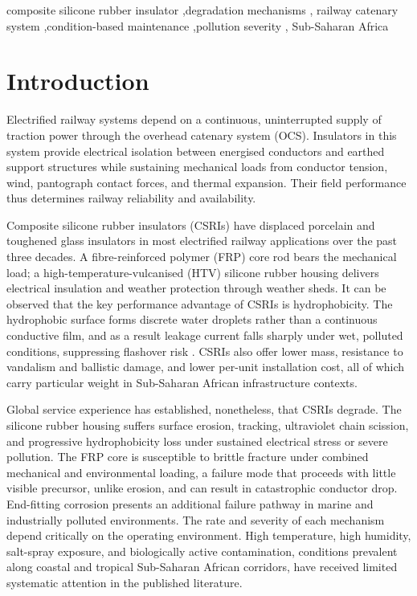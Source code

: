\documentclass[preprint,12pt,3p]{elsarticle}
\begin{document}
\begin{frontmatter}
\begin{keyword}
composite silicone rubber insulator \sep degradation mechanisms \sep
railway catenary system \sep condition-based maintenance \sep pollution severity \sep
Sub-Saharan Africa
\end{keyword}

\end{frontmatter}

\linenumbers

\section{Introduction}
\label{sec:intro}

Electrified railway systems depend on a continuous, uninterrupted supply of
traction power through the overhead catenary system (OCS). Insulators in this
system provide electrical isolation between energised conductors and earthed
support structures while sustaining mechanical loads from conductor tension,
wind, pantograph contact forces, and thermal expansion. Their field performance
thus determines railway reliability and availability.

Composite silicone rubber insulators (CSRIs) have displaced porcelain and
toughened glass insulators in most electrified railway applications over the
past three decades. A fibre-reinforced polymer (FRP) core rod bears the
mechanical load; a high-temperature-vulcanised (HTV) silicone rubber housing
delivers electrical insulation and weather protection through weather sheds.
It can be observed that the key performance advantage of CSRIs is
hydrophobicity. The hydrophobic surface forms discrete water droplets rather
than a continuous conductive film, and as a result leakage current falls
sharply under wet, polluted conditions, suppressing flashover risk
\cite{Gorur1999,Gubanski1990}. CSRIs also offer lower mass, resistance to
vandalism and ballistic damage, and lower per-unit installation cost, all of
which carry particular weight in Sub-Saharan African infrastructure contexts.

Global service experience has established, nonetheless, that CSRIs degrade.
The silicone rubber housing suffers surface erosion, tracking, ultraviolet
chain scission, and progressive hydrophobicity loss under sustained electrical
stress or severe pollution. The FRP core is susceptible to brittle fracture
under combined mechanical and environmental loading, a failure mode that
proceeds with little visible precursor, unlike erosion, and can result in
catastrophic conductor drop. End-fitting corrosion presents an additional
failure pathway in marine and industrially polluted environments. The rate
and severity of each mechanism depend critically on the operating environment.
High temperature, high humidity, salt-spray exposure, and biologically active
contamination, conditions prevalent along coastal and tropical Sub-Saharan
African corridors, have received limited systematic attention in the published
literature.
\end{document}
